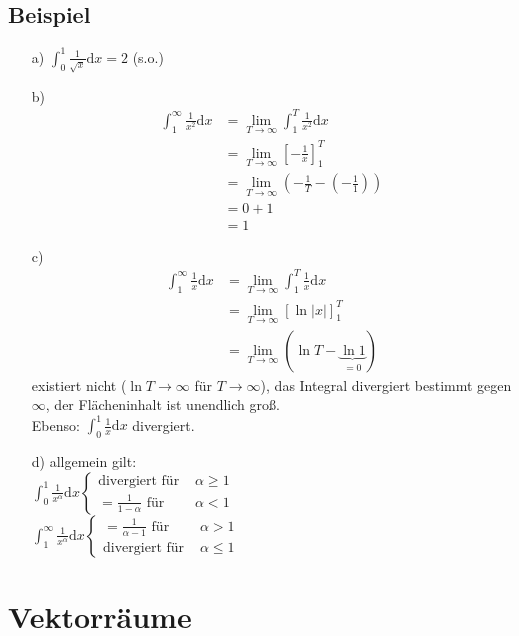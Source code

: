 \documentclass[12pt, titlepage]{article}
\renewcommand{\>}{\rightarrow}
\renewcommand{\*}{\cdot}
\begin{document}
	\subsection{Beispiel}
	\begin{itemize}
		\item[a)] $\int_{0}^{1}\frac{1}{\sqrt{x}}\textrm{d}x=2$ (s.o.)
		\item[b)] \begin{align*}
			\int_{1}^{\infty}\frac{1}{x^2}\textrm{d}x&=\lim\limits_{T\>\infty}\int_{1}^{T}\frac{1}{x^2}\textrm{d}x\\
			&=\lim\limits_{T\>\infty}[-\frac{1}{x}]_1^T\\
			&=\lim\limits_{T\>\infty}(-\frac{1}{T}-(-\frac{1}{1}))\\
			&=0+1\\
			&=1
		\end{align*}
		\item[c)] \begin{align*}
			\int_{1}^{\infty}\frac{1}{x}\textrm{d}x&=\lim\limits_{T\>\infty}\int_{1}^{T}\frac{1}{x}\textrm{d}x\\
			&=\lim\limits_{T\>\infty}[\ln|x|]_1^T\\
			&=\lim\limits_{T\>\infty}(\ln T-\underbrace{\ln 1}_{=0})
		\end{align*}
		existiert nicht ($\ln T\>\infty$ für $T\>\infty$), das Integral divergiert bestimmt gegen $\infty$, der Flächeninhalt ist unendlich groß.\\
		Ebenso: $\int_{0}^{1}\frac{1}{x}\textrm{d}x$ divergiert.
		\item[d)] allgemein gilt:\\
		$\int_{0}^{1}\frac{1}{x^\alpha}\textrm{d}x\begin{cases}\textrm{divergiert für }&\alpha\geq1\\
		=\frac{1}{1-\alpha}\textrm{ für }&\alpha<1
		\end{cases}$\\
		$\int_{1}^{\infty}\frac{1}{x^\alpha}\textrm{d}x\begin{cases}=\frac{1}{\alpha-1}\textrm{ für }&\alpha>1\\
		\textrm{divergiert für }&\alpha\leq1
		\end{cases}$
	\end{itemize}
	\newpage
	\section{Vektorräume}
\end{document}
